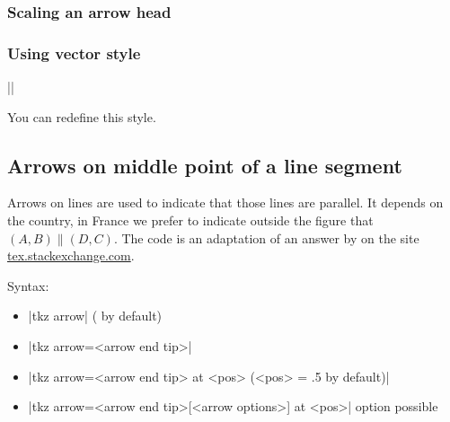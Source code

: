 \subsubsection{Scaling an arrow head}

\begin{tkzexample}[latex=6cm,small]
\end{tkzexample}

\subsubsection{Using vector style}
||

You can redefine this style.
\begin{tkzexample}[latex=6cm,small]
\end{tkzexample}
  
\subsection{Arrows on  middle point of a line segment}

Arrows on lines are used to indicate that those lines are parallel. It depends on the country, in France we prefer to indicate outside the figure that $(A,B) \parallel (D,C)$. The code is an adaptation of an answer by  on the site \href{https://tex.stackexchange.com/questions/632596/how-to-manage-argument-pattern-keys-and-subways}{tex.stackexchange.com}.

\medskip
 Syntax: \\

 \begin{itemize}
\item |tkz arrow| ( by default)
\item |tkz arrow=<arrow end tip>|
\item |tkz arrow=<arrow end tip> at <pos> (<pos> = .5 by default)|
\item |tkz arrow={<arrow end tip>[<arrow options>] at <pos>}| option possible 
 \end{itemize}

